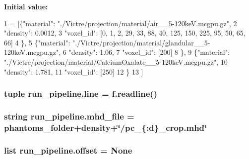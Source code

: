 {\bfseries Initial value\-:}
\begin{DoxyCode}
1 = [\{\textcolor{stringliteral}{"material"}: \textcolor{stringliteral}{"./Victre/projection/material/air\_\_5-120keV.mcgpu.gz"},
2                           \textcolor{stringliteral}{"density"}: 0.0012,
3                           \textcolor{stringliteral}{"voxel\_id"}: [0, 1, 2, 29, 33, 88, 40, 125, 150, 225, 95, 50, 65, 66]
4                           \},
5                          \{\textcolor{stringliteral}{"material"}: \textcolor{stringliteral}{"./Victre/projection/material/glandular\_\_5-120keV.mcgpu.gz"},
6                           \textcolor{stringliteral}{"density"}: 1.06,
7                           \textcolor{stringliteral}{"voxel\_id"}: [200]
8                           \},
9                          \{\textcolor{stringliteral}{"material"}: \textcolor{stringliteral}{"./Victre/projection/material/CalciumOxalate\_\_5-120keV.mcgpu.gz"},
10                           \textcolor{stringliteral}{"density"}: 1.781,
11                           \textcolor{stringliteral}{"voxel\_id"}: [250]
12                           \}
13                          ]
\end{DoxyCode}
\hypertarget{namespacerun__pipeline_aaaa6fb70bbde47bf610f101b1c7365ba}{
\subsubsection[{line}]{\setlength{\rightskip}{0pt plus 5cm}tuple run\-\_\-pipeline.\-line = f.\-readline()}}\label{namespacerun__pipeline_aaaa6fb70bbde47bf610f101b1c7365ba}
\hypertarget{namespacerun__pipeline_abaa1ba9de8ccf7d14b2ca397db5de9e9}{
\subsubsection[{mhd\-\_\-file}]{\setlength{\rightskip}{0pt plus 5cm}string run\-\_\-pipeline.\-mhd\-\_\-file = {\bf phantoms\-\_\-folder}+{\bf density}+\char`\"{}/pc\-\_\-\{\-:d\}\-\_\-crop.\-mhd\char`\"{}}}\label{namespacerun__pipeline_abaa1ba9de8ccf7d14b2ca397db5de9e9}
\hypertarget{namespacerun__pipeline_a82244d07ac01d28c7380290c904cadd7}{
\subsubsection[{offset}]{\setlength{\rightskip}{0pt plus 5cm}list run\-\_\-pipeline.\-offset = None}}\label{namespacerun__pipeline_a82244d07ac01d28c7380290c904cadd7}
